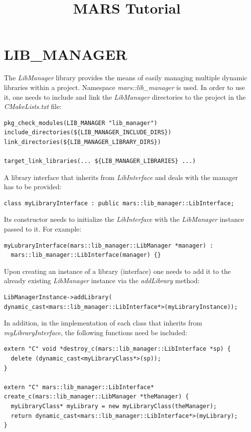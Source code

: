 \documentclass{article}
\title{MARS Tutorial}
\begin{document}
\maketitle

\section{LIB\_MANAGER}

The \emph{LibManager} library provides the means of easily managing multiple dynamic libraries within a project. Namespace \emph{mars::lib\_manager} is used.
In order to use it, one needs to include and link the \emph{LibManager} directories to the project in the \emph{CMakeLists.txt} file:

\begin{lstlisting}
pkg_check_modules(LIB_MANAGER "lib_manager")
include_directories(${LIB_MANAGER_INCLUDE_DIRS})
link_directories(${LIB_MANAGER_LIBRARY_DIRS})

target_link_libraries(... ${LIB_MANAGER_LIBRARIES} ...)
\end{lstlisting}

A library interface that inherits from \emph{LibInterface} and deals with the manager has to be provided:

\begin{lstlisting}
class myLibraryInterface : public mars::lib_manager::LibInterface;
\end{lstlisting}

Its constructor needs to initialize the \emph{LibInterface} with the \emph{LibManager} instance passed to it. For example:

\begin{lstlisting}
myLubraryInterface(mars::lib_manager::LibManager *manager) : 
  mars::lib_manager::LibInterface(manager) {}
\end{lstlisting}

Upon creating an instance of a library (interface) one needs to add it to the already existing \emph{LibManager} instance
via the \emph{addLibrary} method:

\begin{lstlisting}
LibManagerInstance->addLibrary(
dynamic_cast<mars::lib_manager::LibInterface*>(myLibraryInstance));
\end{lstlisting}

In addition, in the implementation of each class that inherits from \emph{myLibraryInterface}, the following functions need 
be included:

\begin{lstlisting}
extern "C" void *destroy_c(mars::lib_manager::LibInterface *sp) {
  delete (dynamic_cast<myLibraryClass*>(sp));
}

extern "C" mars::lib_manager::LibInterface* 
create_c(mars::lib_manager::LibManager *theManager) {
  myLibraryClass* myLibrary = new myLibraryClass(theManager);
  return dynamic_cast<mars::lib_manager::LibInterface*>(myLibrary);
}
\end{lstlisting}
\end{document}
